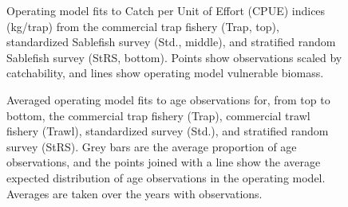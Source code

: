 \documentclass[11pt]{book}
\begin{document}
\begin{figure}[htb]

{\centering {} 

}

\caption{Operating model fits to Catch per Unit of Effort (CPUE) indices (kg/trap) from the commercial trap fishery (Trap, top), standardized Sablefish survey (Std., middle), and stratified random Sablefish survey (StRS, bottom). Points show observations scaled by catchability, and lines show operating model vulnerable biomass.}\label{fig:unnamed-chunk-19}
\end{figure}
\newpage
\begin{figure}[htb]

{\centering {} 

}

\caption{Averaged operating model fits to age observations for, from top to bottom, the commercial trap fishery (Trap), commercial trawl fishery (Trawl), standardized survey (Std.), and stratified random survey (StRS). Grey bars are the average proportion of age observations, and the points joined with a line show the average expected distribution of age observations in the operating model. Averages are taken over the years with observations.}\label{fig:unnamed-chunk-20}
\end{figure}
\newpage
\end{document}
